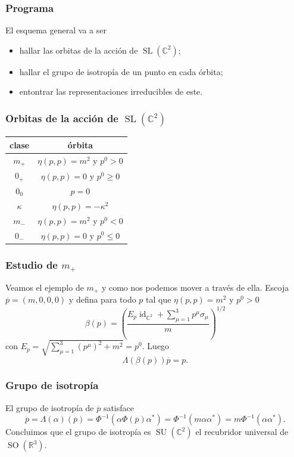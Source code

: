\documentclass{beamer}
\DeclareMathOperator{\SL}{SL}
\DeclareMathOperator{\id}{id}
\DeclareMathOperator{\SU}{SU}
\DeclareMathOperator{\SO}{SO}
\begin{document}
\begin{frame}
\frametitle{Programa}
El esquema general va a ser\cite{Sternberg1994}
\begin{itemize}
\item hallar las orbitas de la acción de $\SL(\mathbb{C}^2)$;
\item hallar el grupo de isotropía de un punto en cada órbita;
\item entontrar las representaciones irreducibles de este.
\end{itemize}
\end{frame}

\begin{frame}
\frametitle{Orbitas de la acción de $\SL(\mathbb{C}^2)$}
\cite{Haag1992}
\begin{center}
\begin{tabular}{|c|c|}
\hline
clase & órbita \\
\hline
$m_+$ & $\eta(p,p)=m^2$ y $p^0>0$ \\
$0_+$ & $\eta(p,p)=0$ y $p^0\geq 0 $ \\
$0_0$ & $p=0$ \\
$\kappa$ & $\eta(p,p)=-\kappa^2$ \\
$m_-$ & $\eta(p,p)=m^2$ y $p^0<0$ \\
$0_-$ & $\eta(p,p)=0$ y $p^0\leq 0$ \\
\hline
\end{tabular}
\end{center}
\end{frame}

\begin{frame}
\frametitle{Estudio de $m_+$}
Veamos el ejemplo de $m_+$ y como nos podemos mover a través de ella. Escoja $\overline{p}=(m,0,0,0)$ y defina para todo $p$ tal que $\eta(p,p)=m^2$ y $p^0>0$
\begin{equation}
\beta(p)=\left(\frac{E_p\id_{\mathbb{C}^2}+\sum_{\mu=1}^3p^\mu\sigma_\mu}{m}\right)^{1/2}
\end{equation}
con $E_p=\sqrt{\sum_{\mu=1}^3(p^\mu)^2+m^2}=p^0$. Luego 
\begin{equation}
\Lambda(\beta(p))\overline{p} = p.
\end{equation}
\end{frame}

\begin{frame}
\frametitle{Grupo de isotropía}
El grupo de isotropía de $\overline{p}$ satisface
\begin{equation}
\overline{p} = \Lambda(\alpha)(\overline{p}) = \Phi^{-1}(\alpha\Phi(\overline{p})\alpha^*) = \Phi^{-1}(m\alpha\alpha^*)=m\Phi^{-1}(\alpha\alpha^*).
\end{equation} 
Concluimos que el grupo de isotropía es $\SU(\mathbb{C}^2)$ el recubridor universal de $\SO(\mathbb{R}^3)$.
\end{frame}
\end{document}

